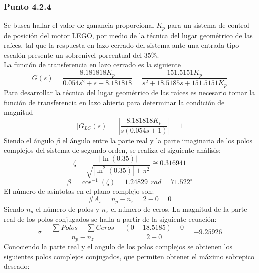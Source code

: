 \documentclass[twocolumn]{IEEEtran}
\begin{document}
\subsubsection{Punto 4.2.4}
\noindent
Se busca hallar el valor de ganancia proporcional $K_p$ para un sistema de control de posición del motor LEGO, por medio de la técnica del lugar geométrico de las raíces, tal que la respuesta en lazo cerrado del sistema ante una entrada tipo escalón presente un sobrenivel porcentual del $35\%$.\\
La función de transferencia en lazo cerrado es la siguiente
\begin{equation}
 G\left( s \right) = \frac{{8.181818K_p }}{{0.054s^2  + s + 8.181818}} = \frac{{151.5151K_p }}{{s^2  + 18.5185s + 151.5151K_p }}
\label{ecu8}
\end{equation}
\noindent
Para desarrollar la técnica del lugar geométrico de las raíces es necesario tomar la función de transferencia en lazo abierto para determinar la condición de magnitud
\begin{equation}
 \left| {G_{LC} \left( s \right)} \right| = \left| {\frac{{8.181818K_p }}{{s\left( {0.054s + 1} \right)}}} \right| = 1
\label{ecu9}
\end{equation}
\noindent
Siendo el ángulo $\beta$ el ángulo entre la parte real y la parte imaginaria de los polos complejos del sistema de segundo orden, se realiza el siguiente análisis:
\begin{equation}
 \zeta  = \frac{{\left| {\ln \left( {0.35} \right)} \right|}}{{\sqrt {\left| {\ln ^2 \left( {0.35} \right)} \right| + \pi ^2 } }} \cong 0.316941
\label{ecu10}
\end{equation}
\begin{equation}
 \beta  = \cos ^{ - 1} \left( \zeta  \right) = 1.24829\ \ rad = 71.522^\circ 
\label{ecu11}
\end{equation}
\noindent
El número de asíntotas en el plano complejo son:
\begin{equation}
 \# A_s = n_p  - n_z  = 2 - 0 = 0
\label{ecu12}
\end{equation}
\noindent
Siendo $n_p$ el número de polos y $n_z$ el número de ceros. La magnitud de la parte real de los polos conjugados se halla a partir de la siguiente ecuación:
\begin{equation}
 \sigma  = \frac{{\sum {Polos}  - \sum {Ceros} }}{{n_p  - n_z }} = \frac{{\left( {0 - 18.5185} \right) - 0}}{{2 - 0}} =  - 9.25926
\label{ecu13}
\end{equation}
\noindent
Conociendo la parte real y el angulo de los polos complejos se obtienen los siguientes polos complejos conjugados, que permiten obtener el máximo sobrepico deseado:
\end{document}
